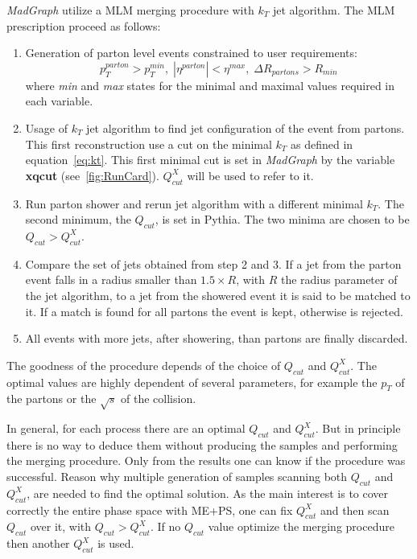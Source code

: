 \textit{MadGraph} utilize a MLM merging procedure with $k_{T}$ jet algorithm. The MLM prescription proceed as follows:
\begin{enumerate}
\item Generation of parton level events constrained to user requirements:
  \begin{equation*}
    p_{T}^{parton}>p_{T}^{min}, \; |\eta^{parton}|<\eta^{max}, \; \Delta R_{partons}>R_{min}
  \end{equation*} where \textit{min} and \textit{max} states for the minimal and maximal values required in each variable.
\item Usage of $k_{T}$ jet algorithm to find jet configuration of the event from partons. This first reconstruction use a cut on the minimal $k_{T}$ as defined in equation~\ref{eq:kt}. This first minimal cut is set in \textit{MadGraph} by the variable \textbf{xqcut} (see~\ref{fig:RunCard}). $Q^{X}_{cut}$ will be used to refer to it.
\item Run parton shower and rerun jet algorithm with a different minimal $k_{T}$. The second minimum, the $Q_{cut}$, is set in Pythia. The two minima are chosen to be $Q_{cut}>Q^{X}_{cut}$.
\item Compare the set of jets obtained from step 2 and 3. If a jet from the parton event falls in a radius smaller than $1.5 \times R$, with $R$ the radius parameter of the jet algorithm, to a jet from the showered event it is said to be matched to it. If a match is found for all partons the event is kept, otherwise is rejected.
\item All events with more jets, after showering, than partons are finally discarded.   
\end{enumerate}

The goodness of the procedure depends of the choice of $Q_{cut}$ and $Q^{X}_{cut}$. The optimal values are highly dependent of several parameters, for example the $p_{T}$ of the partons or the $\sqrt{s}$ of the collision. 

In general, for each process there are an optimal $Q_{cut}$ and $Q^{X}_{cut}$. But in principle there is no way to deduce them without producing the samples and performing the merging procedure. Only from the results one can know if the procedure was successful. Reason why multiple generation of samples scanning both $Q_{cut}$ and $Q^{X}_{cut}$, are needed to find the optimal solution. As the main interest is to cover correctly the entire phase space with ME+PS, one can fix $Q^{X}_{cut}$ and then scan $Q_{cut}$ over it, with $Q_{cut}>Q^{X}_{cut}$. If no $Q_{cut}$ value optimize the merging procedure then another $Q^{X}_{cut}$ is used. 

